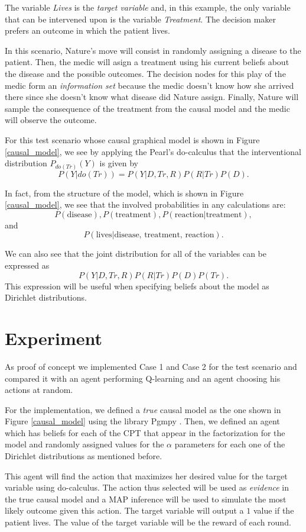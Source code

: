\documentclass{article}
\begin{document}
The variable \textit{Lives} is the \textit{target variable} and, in this example, the only variable that can be intervened upon is the variable \textit{Treatment}. The decision maker prefers an outcome in which the patient lives.

In this scenario, Nature's move will consist in randomly assigning a disease to the patient. Then, the medic will asign a treatment using his current beliefs about the disease and the possible outcomes. The decision nodes for this play of the medic form an \textit{information set} because the medic doesn't know how she arrived there since she doesn't know what disease did Nature assign. Finally, Nature will sample the consequence of the treatment from the causal model and the medic will observe the outcome.

For this test scenario whose causal graphical model is shown in Figure \ref{causal_model}, we see  by applying the Pearl's do-calculus that the interventional distribution $P_{do(Tr)}(Y)$ is given by
\[ P(Y | do(Tr))=P(Y | D, Tr, R)P(R | Tr) P(D). \]

In fact, from the structure of the model, which is shown in Figure \ref{causal_model}, we see that the involved probabilities in any calculations are:
\[ P(\textrm{disease}), P(\textrm{treatment}), P(\textrm{reaction} | \textrm{treatment}), \]
and
\[P(\textrm{lives} | \textrm{disease, treatment, reaction}). \]

We can also see that the joint distribution for all of the variables can be expressed as
\[ P(Y | D, Tr, R)P(R | Tr) P(D)P(Tr). \]
This expression will be useful when specifying beliefs about the model as Dirichlet distributions.
\section{Experiment}
As proof of concept we implemented  Case 1 and Case 2 for the test scenario and compared it with an agent performing Q-learning and an agent choosing his actions at random. 

For the implementation, we defined a \textit{true} causal model as the one shown in Figure \ref{causal_model} using the library Pgmpy \cite{ankan2015pgmpy}. Then, we defined an agent which has beliefs for each of the CPT that appear in the factorization for the model and randomly assigned values for the $\alpha$ parameters for each one of the Dirichlet distributions as mentioned before. 

This agent will find the action that maximizes her desired value for the target variable using do-calculus. The action thus selected will be used as \textit{evidence} in the true causal model and a MAP inference will be used to simulate the most likely outcome given this action. The target variable will output a $1$ value if the patient lives. The value of the target variable will be the reward of each round.
\end{document}
